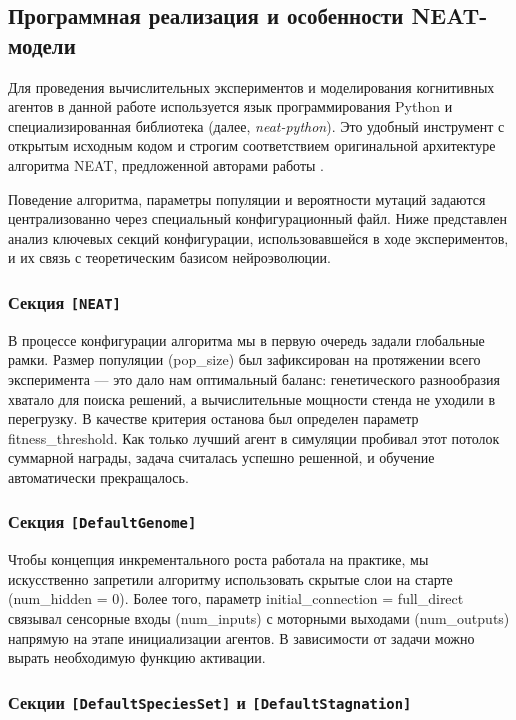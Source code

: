 \subsection{Программная реализация и особенности NEAT-модели}

Для проведения вычислительных экспериментов и моделирования когнитивных агентов в данной работе используется язык программирования Python и специализированная библиотека \cite{McIntyre_neat-python} (далее, \textit{neat-python}). Это удобный инструмент с открытым исходным кодом и строгим соответствием оригинальной архитектуре алгоритма NEAT, предложенной авторами работы \cite{stanley2002neuroevolution}.

Поведение алгоритма, параметры популяции и вероятности мутаций задаются централизованно через специальный конфигурационный файл. Ниже представлен анализ ключевых секций конфигурации, использовавшейся в ходе экспериментов, и их связь с теоретическим базисом нейроэволюции.

\subsubsection{Секция \texttt{[NEAT]}}

В процессе конфигурации алгоритма мы в первую очередь задали глобальные рамки. Размер популяции (pop\_size) был зафиксирован на протяжении всего эксперимента — это дало нам оптимальный баланс: генетического разнообразия хватало для поиска решений, а вычислительные мощности стенда не уходили в перегрузку. В качестве критерия останова был определен параметр fitness\_threshold. Как только лучший агент в симуляции пробивал этот потолок суммарной награды, задача считалась успешно решенной, и обучение автоматически прекращалось.

\subsubsection{Секция \texttt{[DefaultGenome]}}

Чтобы концепция инкрементального роста работала на практике, мы искусственно запретили алгоритму использовать скрытые слои на старте (num\_hidden = 0). Более того, параметр initial\_connection = full\_direct связывал сенсорные входы (num\_inputs) с моторными выходами (num\_outputs) напрямую на этапе инициализации агентов. В зависимости от задачи можно вырать необходимую функцию активации.

\subsubsection{Секции \texttt{[DefaultSpeciesSet]} и \texttt{[DefaultStagnation]}}

